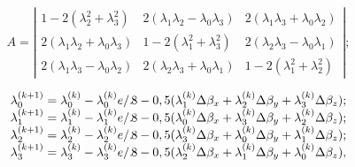 \[A=\left| \begin{array}{ccc} 
{1-2(\lambda_{2}^{2} +\lambda_{3}^{2} )} & {2(\lambda_{1} \lambda_{2}-\lambda_{0} \lambda_{3})} & {2(\lambda_{1} \lambda_{3} +\lambda_{0}\lambda_{2} )} \\ 
{2(\lambda_{1} \lambda_{2} +\lambda_{0} \lambda_{3} )} & {1-2(\lambda_{1}^{2} +\lambda_{3}^{2} )} & {2(\lambda_{2} \lambda_{3} -\lambda_{0}\lambda_{1})} \\ 
{2(\lambda_{1} \lambda_{3} -\lambda_{0} \lambda_{2} )} & {2(\lambda_{2} \lambda_{3} +\lambda_{0} \lambda_{1} )} & {1-2(\lambda_{1}^{2} +\lambda_{2}^{2})} 
\end{array}  \right|;\]


\begin{equation}
\label{eq:qcalc} 
\begin{array}{cccc} 
{\lambda_{0}^{(k+1)}=\lambda_{0}^{(k)} -\lambda_{0}^{(k)} {e \mathord{/{\vphantom{e 8}}.\kern-\nulldelimiterspace} 8} 
-0,5(\lambda_{1}^{(k)} \Delta \beta_{x} +\lambda_{2}^{(k)} \Delta \beta_{y} +\lambda_{3}^{(k)} \Delta \beta_{z});}\\ 
{\lambda_{1}^{(k+1)} =\lambda_{1}^{(k)} -\lambda_{1}^{(k)} {e \mathord{/{\vphantom{e 8}}.\kern-\nulldelimiterspace} 8}
-0,5(\lambda_{0}^{(k)}\Delta \beta_{x} +\lambda_{3}^{(k)} \Delta \beta_{y} +\lambda_{2}^{(k)} \Delta\beta_{z});} \\ 
{\lambda_{2}^{(k+1)} =\lambda_{2}^{(k)} -\lambda_{2}^{(k)} {e \mathord{/{\vphantom{e 8}}.\kern-\nulldelimiterspace} 8} 
-0,5(\lambda_{3}^{(k)} \Delta \beta_{x} +\lambda_{0}^{(k)} \Delta \beta_{y}+\lambda_{1}^{(k)} \Delta \beta_{z} )  ;} \\ 
{\lambda_{3}^{(k+1)} =\lambda_{3}^{(k)} -\lambda_{3}^{(k)} {e \mathord{/{\vphantom{e 8}}.\kern-\nulldelimiterspace} 8} 
-0,5(\lambda_{2}^{(k)} \Delta \beta_{x} +\lambda_{1}^{(k)} \Delta \beta_{y} +\lambda_{0}^{(k)} \Delta \beta_{z} )  ,} 
\end{array} 
\end{equation}

